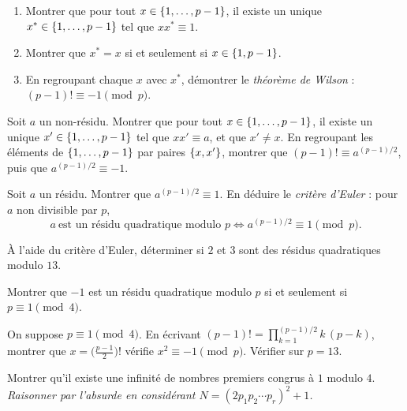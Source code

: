 \begin{exoEval}{}{}
\begin{questions}[start=4]
  \item \begin{enumerate}[label=\alph*)]
      \item Montrer que pour tout $x\in\left\{1,\dots,p-1\right\}$, il existe un
        unique $x^{*}\in\left\{1,\dots,p-1\right\}$ tel que $xx^{*}\equiv1$.
      \item Montrer que $x^{*}=x$ si et seulement si $x\in\left\{1,p-1\right\}$.
      \item En regroupant chaque $x$ avec $x^{*}$, démontrer le
        \emph{théorème de Wilson} : $(p-1)!\equiv-1\pmod p$.
    \end{enumerate}
  \item Soit $a$ un non-résidu. Montrer que pour tout
    $x\in\left\{1,\dots,p-1\right\}$, il existe un unique $x'\in\left\{1,\dots,p-1\right\}$
    tel que $xx'\equiv a$, et que $x'\neq x$. En regroupant les éléments de
    $\left\{1,\dots,p-1\right\}$ par paires $\left\{x,x'\right\}$, montrer que
    $(p-1)!\equiv a^{(p-1)/2}$, puis que $a^{(p-1)/2}\equiv-1$.
  \item Soit $a$ un résidu. Montrer que $a^{(p-1)/2}\equiv1$. En déduire le
    \emph{critère d'Euler} : pour $a$ non divisible par $p$,
    \[a\ \text{est un résidu quadratique modulo }p\iff a^{(p-1)/2}\equiv1\pmod p.\]
\end{questions}
\end{exoEval}

\begin{exoEval}[Applications]{}{}
\begin{questions}[start=7]
  \item À l'aide du critère d'Euler, déterminer si $2$ et $3$ sont des
    résidus quadratiques modulo $13$.
  \item Montrer que $-1$ est un résidu quadratique modulo $p$ si et
    seulement si $p\equiv1\pmod4$.
  \item On suppose $p\equiv1\pmod4$. En écrivant
    $(p-1)!=\prod_{k=1}^{(p-1)/2}k\,(p-k)$, montrer que
    $x=\bigl(\frac{p-1}{2}\bigr)!$ vérifie $x^{2}\equiv-1\pmod p$. Vérifier
    sur $p=13$.
  \item Montrer qu'il existe une infinité de nombres premiers congrus à
    $1$ modulo $4$. \emph{Raisonner par l'absurde en considérant
    $N=(2p_1p_2\cdots p_r)^{2}+1$.}
\end{questions}
\end{exoEval}
